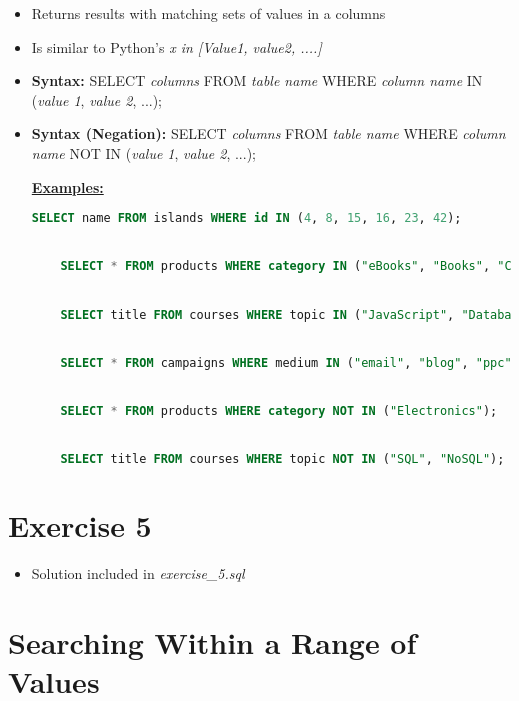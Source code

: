 \documentclass[12pt]{article}
\begin{document}
\bigskip

\begin{itemize}
    \item Returns results with matching sets of values in a columns
    \item Is similar to Python's \textit{x in [Value1, value2, ....]}
    \item \textbf{Syntax:} SELECT \textit{columns} FROM \textit{table name} WHERE \textit{column name} IN (\textit{value 1}, \textit{value 2}, ...);
    \item \textbf{Syntax (Negation):} SELECT \textit{columns} FROM \textit{table name} WHERE \textit{column name} NOT IN (\textit{value 1}, \textit{value 2}, ...);

    \bigskip

    \underline{\textbf{Examples:}}

    \bigskip

    \begin{lstlisting}[language=SQL]
    SELECT name FROM islands WHERE id IN (4, 8, 15, 16, 23, 42);


    SELECT * FROM products WHERE category IN ("eBooks", "Books", "Comics");


    SELECT title FROM courses WHERE topic IN ("JavaScript", "Databases", "CSS");


    SELECT * FROM campaigns WHERE medium IN ("email", "blog", "ppc");


    SELECT * FROM products WHERE category NOT IN ("Electronics");


    SELECT title FROM courses WHERE topic NOT IN ("SQL", "NoSQL");
    \end{lstlisting}
\end{itemize}

\bigskip

\section{Exercise 5}

\bigskip

\begin{itemize}
    \item Solution included in \textit{exercise\_5.sql}
\end{itemize}

\bigskip

\section{Searching Within a Range of Values}
\end{document}
